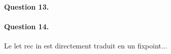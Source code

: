\documentclass{article}
\begin{document}
\paragraph{Question 13.}

\begin{prooftree}
\end{prooftree}

\begin{prooftree}
\end{prooftree}

\begin{prooftree}
\end{prooftree}

\begin{prooftree}
\end{prooftree}

\begin{prooftree}
\end{prooftree}

\begin{prooftree}
\end{prooftree}

\paragraph{Question 14.}

Le let rec in est directement traduit en un fixpoint...
\end{document}
